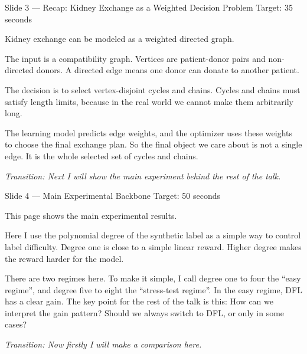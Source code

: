 \documentclass[11pt,aspectratio=169]{beamer}
\newcommand{\tr}[1]{\vspace{0.35em}\textit{\textcolor{black!55}{Transition: #1}}}
\newcommand{\timing}[1]{\textcolor{black!45}{\scriptsize Target: #1}\par\vspace{0.25em}}
\begin{document}
\begin{frame}{Slide 3 \enspace\textmd{\small\textcolor{black!40}{--- Recap: Kidney Exchange as a Weighted Decision Problem}}}
\small
\timing{35 seconds}

Kidney exchange can be modeled as a weighted directed graph.

\vspace{0.35em}
The input is a compatibility graph. Vertices are patient-donor pairs and non-directed donors. A directed edge means one donor can donate to another patient.

\vspace{0.35em}
The decision is to select vertex-disjoint cycles and chains. Cycles and chains must satisfy length limits, because in the real world we cannot make them arbitrarily long.

\vspace{0.35em}
The learning model predicts edge weights, and the optimizer uses these weights to choose the final exchange plan. So the final object we care about is not a single edge. It is the whole selected set of cycles and chains.

\tr{Next I will show the main experiment behind the rest of the talk.}
\end{frame}

\begin{frame}{Slide 4 \enspace\textmd{\small\textcolor{black!40}{--- Main Experimental Backbone}}}
\small
\timing{50 seconds}

This page shows the main experimental results.

\vspace{0.35em}
Here I use the polynomial degree of the synthetic label as a simple way to control label difficulty. Degree one is close to a simple linear reward. Higher degree makes the reward harder for the model.

\vspace{0.35em}
There are two regimes here. To make it simple, I call degree one to four the ``easy regime'', and degree five to eight the ``stress-test regime''. In the easy regime, DFL has a clear gain.
\vspace{0.35em}
The key point for the rest of the talk is this: How can we interpret the gain pattern? Should we always switch to DFL, or only in some cases?

\tr{Now firstly I will make a comparison here.}
\end{frame}
\end{document}
